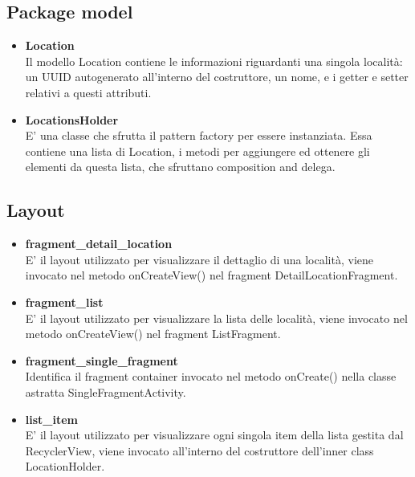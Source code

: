 \documentclass{article}
\begin{document}
\subsection{Package model}
\begin{itemize} 
    \item \textbf{Location} \\
    Il modello Location contiene le informazioni riguardanti una singola località: un UUID autogenerato
    all'interno del costruttore, un nome, e i getter e setter relativi a questi attributi.
    \item \textbf{LocationsHolder} \\
    E' una classe che sfrutta il pattern factory per essere instanziata. Essa contiene una lista di Location,
    i metodi per aggiungere ed ottenere gli elementi da questa lista, che sfruttano composition and delega.
\end{itemize}

\subsection{Layout}
\begin{itemize} 
    \item \textbf{fragment\_detail\_location} \\
    E' il layout utilizzato per visualizzare il dettaglio di una località, viene invocato nel metodo
    onCreateView() nel fragment DetailLocationFragment.
    \item \textbf{fragment\_list} \\
    E' il layout utilizzato per visualizzare la lista delle località, viene invocato nel metodo
    onCreateView() nel fragment ListFragment.
    \item \textbf{fragment\_single\_fragment} \\
    Identifica il fragment container invocato nel metodo onCreate() nella classe astratta SingleFragmentActivity.
    \item \textbf{list\_item} \\
    E' il layout utilizzato per visualizzare ogni singola item della lista gestita dal RecyclerView, viene invocato
    all'interno del costruttore dell'inner class LocationHolder.
\end{itemize}
\end{document}
